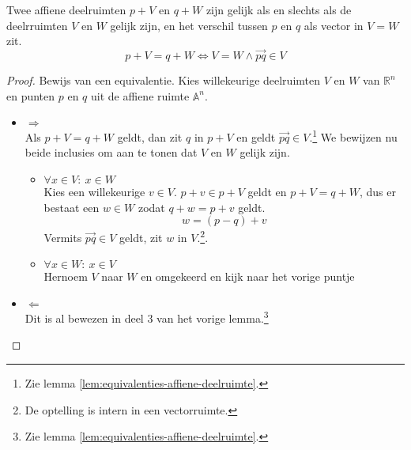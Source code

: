 \documentclass[main.tex]{subfiles}
\begin{document}
\begin{st}
  Twee affiene deelruimten $p + V$ en $q + W$ zijn gelijk als en slechts als de deelrruimten $V$ en $W$ gelijk zijn, en het verschil tussen $p$ en $q$ als vector in $V = W$ zit.
  \[ p + V = q + W \Leftrightarrow V = W \wedge \overrightarrow{pq} \in V\]

  \begin{proof}
    Bewijs van een equivalentie.
    Kies willekeurige deelruimten $V$ en $W$ van $\mathbb{R}^{n}$ en punten $p$ en $q$ uit de affiene ruimte $\mathbb{A}^{n}$.
    \begin{itemize}
    \item $\Rightarrow$\\
      Als $p + V = q + W$ geldt, dan zit $q$ in $p + V$ en geldt $\overrightarrow{pq} \in V$.\footnote{Zie lemma \ref{lem:equivalenties-affiene-deelruimte}.}
      We bewijzen nu beide inclusies om aan te tonen dat $V$ en $W$ gelijk zijn.
      \begin{itemize}
      \item $\forall x \in V:\ x \in W$\\
      Kies een willekeurige $v \in V$.
      $p + v \in p + V$ geldt en $p + V = q + W$, dus er bestaat een $w \in W$ zodat $q + w = p + v$ geldt.
      \[ w = (p-q) + v \]
      Vermits $\overrightarrow{pq} \in V$ geldt, zit $w$ in $V$.\footnote{De optelling is intern in een vectorruimte.}.
      \item $\forall x \in W:\ x \in V$\\
        Hernoem $V$ naar $W$ en omgekeerd en kijk naar het vorige puntje
      \end{itemize}
    \item $\Leftarrow$\\
      Dit is al bewezen in deel 3 van het vorige lemma.\footnote{Zie lemma \ref{lem:equivalenties-affiene-deelruimte}.}
    \end{itemize}
  \end{proof}
\end{st}
\end{document}
